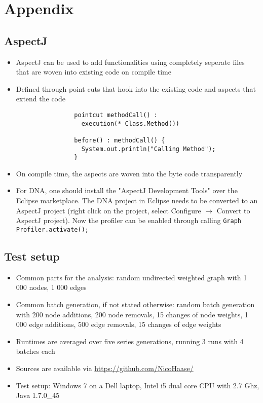 \section{Appendix}
\subsection{AspectJ} \label{sec:aspectj}
	\begin{itemize}
		\item AspectJ can be used to add functionalities using completely
			seperate files that are woven into existing code on compile time
		\item Defined through point cuts that hook into the existing code and aspects that
			extend the code
	
			\begin{verbatim}
				pointcut methodCall() :
				  execution(* Class.Method())
				  
				before() : methodCall() {
				  System.out.println("Calling Method");
				}
			\end{verbatim}
		
		\item On compile time, the aspects are woven into the byte code transparently
		\item For DNA, one should install the "AspectJ Development Tools" over the Eclipse
			marketplace. The DNA project in Eclipse needs to be converted to an AspectJ project
			(right click on the project, select Configure $\rightarrow$ Convert to AspectJ
			project). Now the profiler can be enabled through calling \texttt{Graph\allowbreak
			Profiler.\allowbreak activate();}
		
	\end{itemize}
\subsection{Test setup} \label{sec:testSetup}
	\begin{itemize}
		\item Common parts for the analysis: random undirected weighted graph with 1 000 nodes, 1 000 edges
		\item Common batch generation, if not stated otherwise: random batch generation with 200
			node additions, 200 node removals, 15 changes of node weights, 1 000 edge additions,
			500 edge removals, 15 changes of edge weights
		\item Runtimes are averaged over five series generations, running 3 runs with 4 batches
			each
		\item Sources are available via \url{https://github.com/NicoHaase/}
		\item Test setup: Windows 7 on a Dell laptop, Intel i5 dual core CPU with 2.7 Ghz, Java
			1.7.0\_45
	\end{itemize}